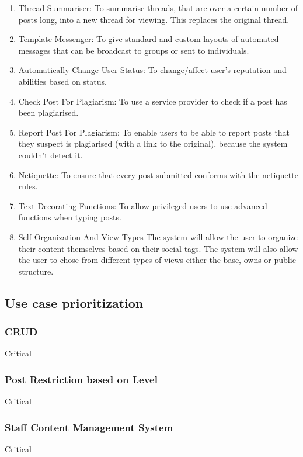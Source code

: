 \documentclass[hidelinks, 12pt, oneside]{article}
\begin{document}
\begin{enumerate}
 \item{Thread Summariser}: To summarise threads, that are over a certain number of posts long, into a new thread for viewing. This replaces the original thread.

 \item{Template Messenger}: To give standard and custom layouts of automated messages that can be broadcast to groups or sent to individuals.

 \item{Automatically Change User Status}: To change/affect user's reputation and abilities based on status.

 \item{Check Post For Plagiarism}: To use a service provider to check if a post has been plagiarised.

 \item{Report Post For Plagiarism}: To enable users to be able to report posts that they suspect is plagiarised (with a link to the original), because the system couldn't detect it.

 \item{Netiquette}: To ensure that every post submitted conforms with the netiquette rules.

 \item{Text Decorating Functions}: To allow privileged users to use advanced functions when typing posts.

 \item{Self-Organization And View Types} The system will allow the user to organize their content themselves based on their social tags. The system will also allow the user to chose from different types of views either the base, owns or public structure.
 
\end{enumerate}

\subsection{Use case prioritization}
\subsubsection{CRUD}
Critical
\subsubsection{Post Restriction based on Level}
Critical
\subsubsection{Staff Content Management System}
Critical
\end{document}
